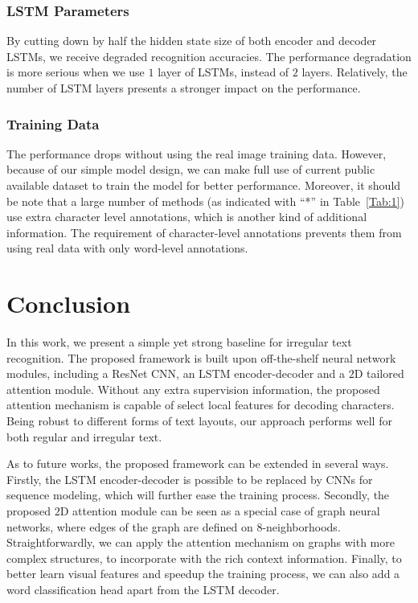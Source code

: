 \documentclass[letterpaper]{article} \usepackage{aaai19}  \usepackage{times}  \usepackage{helvet}  \usepackage{courier}  \usepackage{url}  \usepackage{graphicx}  \usepackage{amsmath}
\begin{document}
\subsubsection{\bf LSTM Parameters}
By cutting down by half the hidden state size of both encoder and decoder LSTMs, we receive degraded recognition accuracies. The performance degradation is more serious when we use $1$ layer of LSTMs, instead of $2$ layers.
Relatively, the number of LSTM layers presents a stronger impact on the performance.

\subsubsection{\bf Training Data}
The performance drops without using the real image training data. However, because of our simple model design, we can make full use of current public available dataset to train the model for better performance. Moreover, it should be note that a large number of methods (as indicated with ``*'' in Table~\ref{Tab:1}) use extra character level annotations, which is another kind of additional information. The requirement of character-level annotations prevents them from using real data with only word-level annotations.




\section{Conclusion}
\label{SEC:Con}
In this work, we present a simple yet strong baseline for irregular text recognition.
The proposed framework is built upon off-the-shelf neural network modules, including a ResNet CNN, an LSTM encoder-decoder and
a $2$D tailored attention module.
Without any extra supervision information, the proposed attention mechanism is capable of select local features for decoding characters.
Being robust to different forms of text layouts, our approach performs well for both regular and irregular text.

As to future works, the proposed framework can be extended in several ways.
Firstly, the LSTM encoder-decoder is possible to be replaced by CNNs for sequence modeling, which will further ease the training process.
Secondly, the proposed $2$D attention module can be seen as a special case of graph neural networks, where edges of the graph are defined on $8$-neighborhoods.
Straightforwardly, we can apply the attention mechanism on graphs with more complex structures, to incorporate with the rich context information.
Finally, to better learn visual features and speedup the training process, we can also add a word classification head apart from the LSTM decoder.




\end{document}
